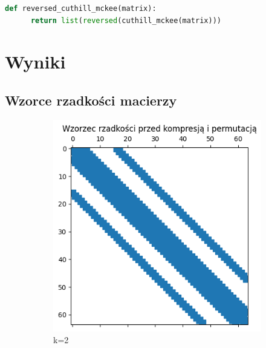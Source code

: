 \documentclass{article}
\begin{document}
\begin{lstlisting}[language=Python, caption={metoda reversed Culthill-McKee}]
  def reversed_cuthill_mckee(matrix):
      return list(reversed(cuthill_mckee(matrix)))
\end{lstlisting}
\section{Wyniki}

\subsection{Wzorce rzadkości macierzy}
\FloatBarrier
\begin{figure}[htbp]
  \centering
  \begin{subfigure}[b]{0.4\textwidth}
      \includegraphics[width=\linewidth]{img/2ak2.png}
      \caption{k=2}
      \label{fig:obraz1}
  \end{subfigure}
  \hfill
  \begin{subfigure}[b]{0.4\textwidth}

\end{subfigure}
\end{figure}
\end{document}
